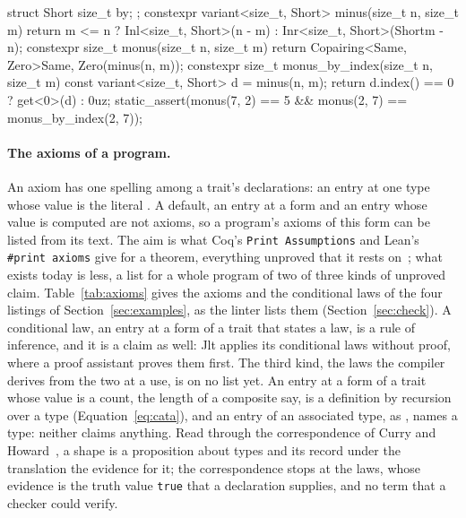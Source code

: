 \begin{listing}[ht]
\begin{cpp}
struct Short { size_t by; };
constexpr variant<size_t, Short> minus(size_t n, size_t m) {
  return m <= n ? Inl<size_t, Short>{}(n - m)
                : Inr<size_t, Short>{}(Short{m - n}); }
constexpr size_t monus(size_t n, size_t m) {
  return Copairing<Same, Zero>{Same{}, Zero{}}(minus(n, m)); }
constexpr size_t monus_by_index(size_t n, size_t m) {
  const variant<size_t, Short> d = minus(n, m);
  return d.index() == 0 ? get<0>(d) : 0uz; }
static_assert(monus(7, 2) == 5 && monus(2, 7) == monus_by_index(2, 7));
\end{cpp}
\caption{Subtraction on the naturals, read by a copairing,  the identity and  the constant $0$, and by the conditional that is its sugar (Table~\ref{tab:derived}).
From \texttt{tools/jlt-lint/fixtures/sum.cpp}, where the linter gives  and  the level FJlt and  Jlt.}
\label{lst:subtraction}
\end{listing}

\paragraph{The axioms of a program.}
\label{app:fjlt:axioms}
An axiom has one spelling among a trait's declarations: an entry at one type whose value is the literal .
A default, an entry at a form and an entry whose value is computed are not axioms, so a program's axioms of this form can be listed from its text.
The aim is what Coq's \texttt{Print Assumptions} and Lean's \texttt{\#print axioms} give for a theorem, everything unproved that it rests on~\cite{Coq,demoura2021lean}; what exists today is less, a list for a whole program of two of three kinds of unproved claim.
Table~\ref{tab:axioms} gives the axioms and the conditional laws of the four listings of Section~\ref{sec:examples}, as the linter lists them (Section~\ref{sec:check}).
A conditional law, an entry at a form of a trait that states a law, is a rule of inference, and it is a claim as well: Jlt applies its conditional laws without proof, where a proof assistant proves them first.
The third kind, the laws the compiler derives from the two at a use, is on no list yet.
An entry at a form of a trait whose value is a count, the length of a composite say, is a definition by recursion over a type (Equation~\eqref{eq:cata}), and an entry of an associated type, as , names a type: neither claims anything.
Read through the correspondence of Curry and Howard~\cite{curry1934functionality,howard1980formulae,sorensen2006lectures}, a shape is a proposition about types and its record under the translation the evidence for it; the correspondence stops at the laws, whose evidence is the truth value \texttt{true} that a declaration supplies, and no term that a checker could verify.

